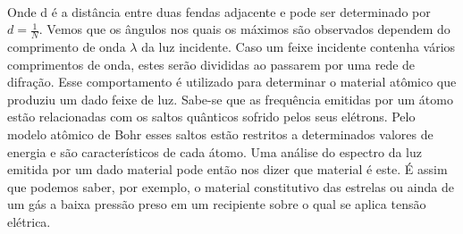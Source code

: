 \documentclass[a4paper,11pt]{article}
\begin{document}
\paragraph{}Onde d é a distância entre duas fendas adjacente e pode
ser determinado por $d = \frac{1}{N}$.  Vemos que os ângulos
nos quais os máximos são observados dependem do 
comprimento de onda $\lambda$ da luz incidente.
Caso um feixe incidente contenha 
vários comprimentos de onda, estes serão divididas
ao passarem por uma rede de difração.
Esse comportamento é utilizado para determinar
o material atômico que produziu um dado feixe
de luz. Sabe-se que as frequência emitidas por um
átomo estão relacionadas com os saltos quânticos
sofrido pelos seus elétrons. Pelo modelo atômico de Bohr
esses saltos estão restritos a determinados valores
de energia e são característicos de cada átomo. Uma
análise do espectro da luz emitida por um dado
material pode então nos dizer que material é este.
É assim que podemos saber, por exemplo, o material
constitutivo das estrelas ou ainda de um gás a baixa
pressão preso em um recipiente sobre o qual se aplica 
tensão elétrica.
\FloatBarrier
\end{document}
